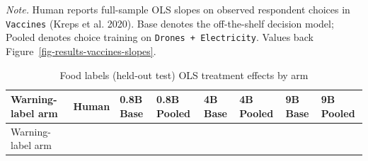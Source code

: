 \documentclass[
  11pt,
  letterpaper,
]{article}
\makeatletter
\newcommand\table@defaultsize{\footnotesize}
\let\table@size\table@defaultsize
\newcommand\nexttablesize[1]{\gdef\table@size{#1}}
\makeatother
\begin{document}
\emph{Note.} Human reports full-sample OLS slopes on observed respondent
choices in \texttt{Vaccines} (Kreps et al. 2020). Base denotes the
off-the-shelf decision model; Pooled denotes choice training on
\texttt{Drones\ +\ Electricity}. Values back
Figure~\ref{fig-results-vaccines-slopes}.

\nexttablesize{\scriptsize}
{\def\LTcaptype{apptbl}
\begin{longtable}[]{@{}
  >{\raggedright\arraybackslash}p{}
  >{\raggedleft\arraybackslash}p{}
  >{\raggedleft\arraybackslash}p{}
  >{\raggedleft\arraybackslash}p{}
  >{\raggedleft\arraybackslash}p{}
  >{\raggedleft\arraybackslash}p{}
  >{\raggedleft\arraybackslash}p{}
  >{\raggedleft\arraybackslash}p{}@{}}
\caption{{\label{apptbl-food-slopes}}Food labels (held-out test) OLS
treatment effects by arm}\tabularnewline
\toprule\noalign{}
\begin{minipage}[b]{\linewidth}\raggedright
Warning-label arm
\end{minipage} & \begin{minipage}[b]{\linewidth}\raggedleft
Human
\end{minipage} & \begin{minipage}[b]{\linewidth}\raggedleft
0.8B Base
\end{minipage} & \begin{minipage}[b]{\linewidth}\raggedleft
0.8B Pooled
\end{minipage} & \begin{minipage}[b]{\linewidth}\raggedleft
4B Base
\end{minipage} & \begin{minipage}[b]{\linewidth}\raggedleft
4B Pooled
\end{minipage} & \begin{minipage}[b]{\linewidth}\raggedleft
9B Base
\end{minipage} & \begin{minipage}[b]{\linewidth}\raggedleft
9B Pooled
\end{minipage} \\
\midrule\noalign{}
\endfirsthead
\toprule\noalign{}
\begin{minipage}[b]{\linewidth}\raggedright
Warning-label arm

\end{minipage}
\end{longtable}}
\end{document}

